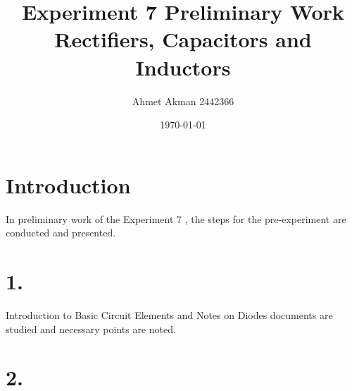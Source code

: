 \documentclass[letterpaper,12pt]{article}
\begin{document}
\title{Experiment 7 Preliminary Work \protect\\ Rectifiers, Capacitors  and Inductors}
\author{Ahmet Akman 2442366 \protect\\}
\date{\today}
\maketitle
\newpage
\tableofcontents
\newpage

\section*{Introduction} 
In preliminary work of the Experiment 7 , the steps for the pre-experiment are conducted and presented.
\section{1.}
Introduction to Basic Circuit Elements and Notes on Diodes documents are studied and necessary points are noted.
\section{2.}
\end{document}

